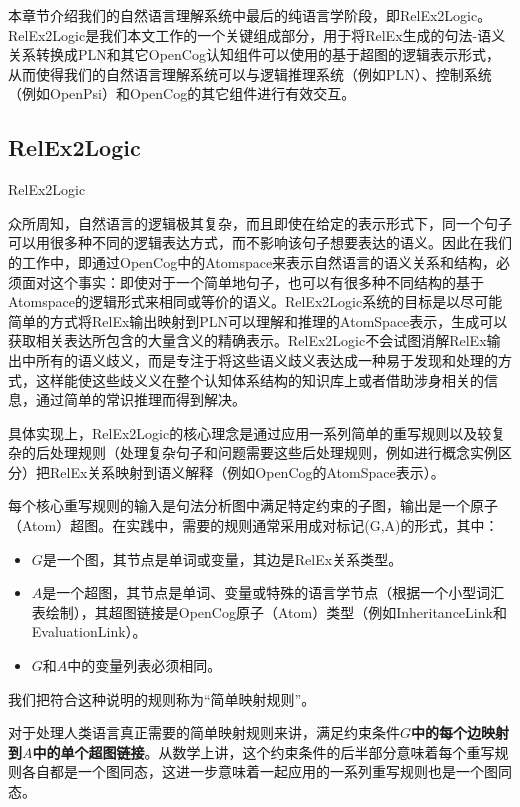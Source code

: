 本章节介绍我们的自然语言理解系统中最后的纯语言学阶段，即RelEx2Logic。RelEx2Logic是我们本文工作的一个关键组成部分，用于将RelEx生成的句法-语义关系转换成PLN和其它OpenCog认知组件可以使用的基于超图的逻辑表示形式，从而使得我们的自然语言理解系统可以与逻辑推理系统（例如PLN）、控制系统（例如OpenPsi）和OpenCog的其它组件进行有效交互。

\subsection{RelEx2Logic}{RelEx2Logic}

众所周知，自然语言的逻辑极其复杂，而且即使在给定的表示形式下，同一个句子可以用很多种不同的逻辑表达方式，而不影响该句子想要表达的语义。因此在我们的工作中，即通过OpenCog中的Atomspace来表示自然语言的语义关系和结构，必须面对这个事实：即使对于一个简单地句子，也可以有很多种不同结构的基于Atomspace的逻辑形式来相同或等价的语义。RelEx2Logic系统的目标是以尽可能简单的方式将RelEx输出映射到PLN可以理解和推理的AtomSpace表示，生成可以获取相关表达所包含的大量含义的精确表示。RelEx2Logic不会试图消解RelEx输出中所有的语义歧义，而是专注于将这些语义歧义表达成一种易于发现和处理的方式，这样能使这些歧义义在整个认知体系结构的知识库上或者借助涉身相关的信息，通过简单的常识推理而得到解决。

具体实现上，RelEx2Logic的核心理念是通过应用一系列简单的重写规则以及较复杂的后处理规则（处理复杂句子和问题需要这些后处理规则，例如进行概念实例区分）把RelEx关系映射到语义解释（例如OpenCog的AtomSpace表示）。

每个核心重写规则的输入是句法分析图中满足特定约束的子图，输出是一个原子（Atom）超图。在实践中，需要的规则通常采用成对标记(G,A)的形式，其中：

\begin{itemize}
\item $G$是一个图，其节点是单词或变量，其边是RelEx关系类型。
\item  $A$是一个超图，其节点是单词、变量或特殊的语言学节点（根据一个小型词汇表绘制），其超图链接是OpenCog原子（Atom）类型（例如InheritanceLink和EvaluationLink）。
\item $G$和$A$中的变量列表必须相同。
\end{itemize}

我们把符合这种说明的规则称为“简单映射规则”。

对于处理人类语言真正需要的简单映射规则来讲，满足约束条件{\bf $G$中的每个边映射到$A$中的单个超图链接}。从数学上讲，这个约束条件的后半部分意味着每个重写规则各自都是一个图同态\cite{Voloshin2009}，这进一步意味着一起应用的一系列重写规则也是一个图同态。

